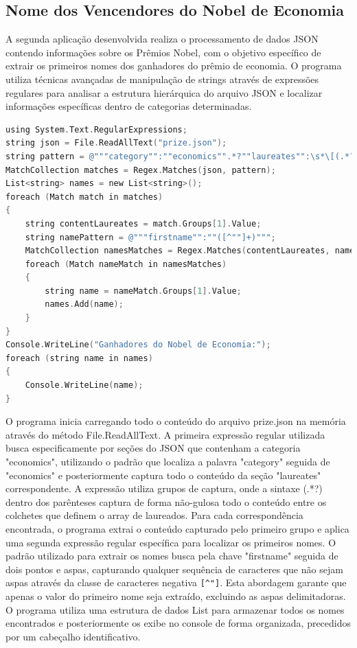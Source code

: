 \documentclass[
	12pt,				%
	oneside,			%
	a4paper,			%
	english,			%
	brazil,				%
	]{abntex2}
\begin{document}
{\subsection{Nome dos Vencendores do Nobel de Economia}

A segunda aplicação desenvolvida realiza o processamento de dados JSON contendo informações sobre os Prêmios Nobel, com o objetivo específico de extrair os primeiros nomes dos ganhadores do prêmio de economia. O programa utiliza técnicas avançadas de manipulação de strings através de expressões regulares para analisar a estrutura hierárquica do arquivo JSON e localizar informações específicas dentro de categorias determinadas.

\begin{lstlisting}[language=C]
using System.Text.RegularExpressions;
string json = File.ReadAllText("prize.json");
string pattern = @"""category"":""economics"".*?""laureates"":\s*\[(.*?)\]";
MatchCollection matches = Regex.Matches(json, pattern);
List<string> names = new List<string>();
foreach (Match match in matches)
{
    string contentLaureates = match.Groups[1].Value;
    string namePattern = @"""firstname"":""([^""]+)""";
    MatchCollection namesMatches = Regex.Matches(contentLaureates, namePattern);
    foreach (Match nameMatch in namesMatches)
    {
        string name = nameMatch.Groups[1].Value;
        names.Add(name);
    }
}
Console.WriteLine("Ganhadores do Nobel de Economia:");
foreach (string name in names)
{
    Console.WriteLine(name);
}
\end{lstlisting}

O programa inicia carregando todo o conteúdo do arquivo prize.json na memória através do método File.ReadAllText. A primeira expressão regular utilizada busca especificamente por seções do JSON que contenham a categoria "economics", utilizando o padrão que localiza a palavra "category" seguida de "economics" e posteriormente captura todo o conteúdo da seção "laureates" correspondente. A expressão utiliza grupos de captura, onde a sintaxe (.*?) dentro dos parênteses captura de forma não-gulosa todo o conteúdo entre os colchetes que definem o array de laureados. Para cada correspondência encontrada, o programa extrai o conteúdo capturado pelo primeiro grupo e aplica uma segunda expressão regular específica para localizar os primeiros nomes. O padrão utilizado para extrair os nomes busca pela chave "firstname" seguida de dois pontos e aspas, capturando qualquer sequência de caracteres que não sejam aspas através da classe de caracteres negativa \verb|[^"]|. Esta abordagem garante que apenas o valor do primeiro nome seja extraído, excluindo as aspas delimitadoras. O programa utiliza uma estrutura de dados List para armazenar todos os nomes encontrados e posteriormente os exibe no console de forma organizada, precedidos por um cabeçalho identificativo.

}
\end{document}

